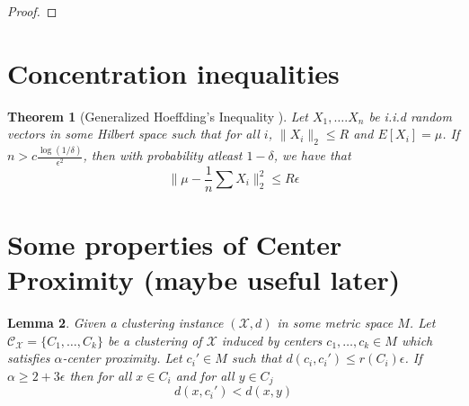\documentclass[11pt]{article}
\newtheorem{theorem}{Theorem}
\newtheorem{lemma}[theorem]{Lemma}
\newcommand{\mc}{\mathcal}
\begin{document}
\begin{proof}

\end{proof}


 

\appendix
\section{Concentration inequalities}
\label{section:conIneq}

\begin{theorem}[Generalized Hoeffding's Inequality \cite{ashtiani2015dimension}]
Let $X_1, \ldots. X_n$ be i.i.d random vectors in some Hilbert space such that for all $i$, $\|X_i\|_2 \le R$ and $E[X_i] = \mu$. If $n > c\frac{\log(1/\delta)}{\epsilon^2}$, then with probability atleast $1-\delta$, we have that
$$\Big\|\mu - \frac{1}{n}\sum X_i\Big\|_2^2 \le R\epsilon$$ 
\end{theorem}

\section{Some properties of Center Proximity (maybe useful later)}
\begin{lemma}
\label{lemma:hasPropertyR}
Given a clustering instance $(\mc X, d)$ in some metric space $M$. Let $\mc C_{\mc X} = \{C_1, \ldots, C_k\}$ be a clustering of $\mc X$ induced by centers $c_1, \ldots, c_k \in M$ which satisfies $\alpha$-center proximity. Let $c_i' \in M$ such that $d(c_i, c_i') \le r(C_i)\epsilon$. If $\alpha \ge 2 + 3\epsilon$ then for all $x \in C_i$ and for all $y \in C_j$
$$d(x, c_i') < d(x, y)$$  
\end{lemma}
\end{document}
